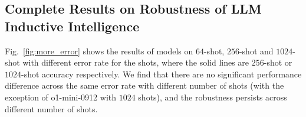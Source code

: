 





\subsection{Complete Results on Robustness of LLM Inductive Intelligence}
\label{sec:more_error_abl}
Fig.~\ref{fig:more_error} shows the results of models on $64$-shot, $256$-shot and $1024$-shot with different error rate for the shots, where the solid lines are $256$-shot or $1024$-shot accuracy respectively. We find that there are no significant performance difference across the same error rate with different number of shots (with the exception of o1-mini-0912 with $1024$ shots), and the robustness persists across different number of shots.

